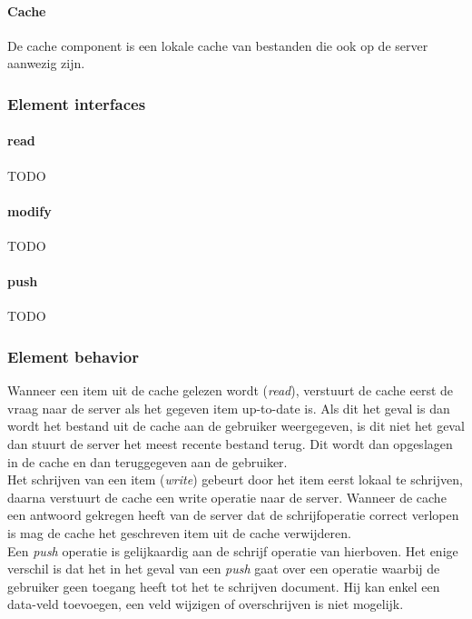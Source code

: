 \documentclass[a4paper,10pt]{book}
\begin{document}
\paragraph{Cache}
De cache component is een lokale cache van bestanden die ook op de server aanwezig zijn.

\subsubsection{Element interfaces} 

\paragraph{read}
TODO

\paragraph{modify}
TODO

\paragraph{push}
TODO

\subsubsection{Element behavior}
Wanneer een item uit de cache gelezen wordt (\textit{read}), verstuurt de cache eerst de vraag naar de server als het gegeven item up-to-date is.  Als dit het geval is dan wordt het bestand uit de cache aan de gebruiker weergegeven, is dit niet het geval dan stuurt de server het meest recente bestand terug.  Dit wordt dan opgeslagen in de cache en dan teruggegeven aan de gebruiker.\\
Het schrijven van een item (\textit{write}) gebeurt door het item eerst lokaal te schrijven, daarna verstuurt de cache een write operatie naar de server.  Wanneer de cache een antwoord gekregen heeft van de server dat de schrijfoperatie correct verlopen is mag de cache het geschreven item uit de cache verwijderen.\\
Een \textit{push} operatie is gelijkaardig aan de schrijf operatie van hierboven.  Het enige verschil is dat het in het geval van een \textit{push} gaat over een operatie waarbij de gebruiker geen toegang heeft tot het te schrijven document.  Hij kan enkel een data-veld toevoegen, een veld wijzigen of overschrijven is niet mogelijk.
\end{document}
